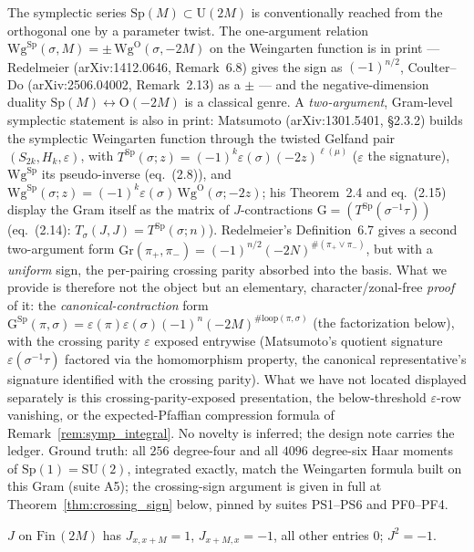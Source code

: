 The symplectic series $\mathrm{Sp}(M)\subset\mathrm U(2M)$ is conventionally
reached from the orthogonal one by a parameter twist. The one-argument
relation $\mathrm{Wg}^{\mathrm{Sp}}(\sigma,M) = \pm\,\mathrm{Wg}^{\mathrm O}(\sigma,-2M)$
on the Weingarten function is in print --- Redelmeier (arXiv:1412.0646,
Remark~6.8) gives the sign as $(-1)^{n/2}$, Coulter--Do (arXiv:2506.04002,
Remark~2.13) as a $\pm$ --- and the negative-dimension duality
$\mathrm{Sp}(M)\leftrightarrow\mathrm O(-2M)$ is a classical genre. A
\emph{two-argument}, Gram-level symplectic statement is also in print:
Matsumoto (arXiv:1301.5401, \S2.3.2) builds the symplectic Weingarten
function through the twisted Gelfand pair $(S_{2k},H_k,\varepsilon)$, with
$T^{\mathrm{Sp}}(\sigma;z)=(-1)^k\varepsilon(\sigma)(-2z)^{\ell(\mu)}$
($\varepsilon$ the signature), $\mathrm{Wg}^{\mathrm{Sp}}$ its pseudo-inverse
(eq.~(2.8)), and $\mathrm{Wg}^{\mathrm{Sp}}(\sigma;z) =
(-1)^k\varepsilon(\sigma)\,\mathrm{Wg}^{\mathrm O}(\sigma;-2z)$; his
Theorem~2.4 and eq.~(2.15) display the Gram itself as the matrix of
$J$-contractions $\mathrm G=(T^{\mathrm{Sp}}(\sigma^{-1}\tau))$ (eq.~(2.14):
$T_\sigma(J,J)=T^{\mathrm{Sp}}(\sigma;n)$). Redelmeier's Definition~6.7 gives
a second two-argument form $\mathrm{Gr}(\pi_+,\pi_-) =
(-1)^{n/2}(-2N)^{\#(\pi_+\vee\pi_-)}$, but with a \emph{uniform} sign, the
per-pairing crossing parity absorbed into the basis. What we provide is
therefore not the object but an elementary, character/zonal-free \emph{proof}
of it: the \emph{canonical-contraction} form $\mathrm G^{\mathrm{Sp}}(\pi,\sigma) =
\varepsilon(\pi)\varepsilon(\sigma)(-1)^n(-2M)^{\#\mathrm{loop}(\pi,\sigma)}$
(the factorization below), with the crossing parity $\varepsilon$ exposed
entrywise (Matsumoto's quotient signature $\varepsilon(\sigma^{-1}\tau)$
factored via the homomorphism property, the canonical representative's
signature identified with the crossing parity). What we have not located
displayed separately is this crossing-parity-exposed presentation, the
below-threshold $\varepsilon$-row vanishing, or the expected-Pfaffian
compression formula of Remark~\ref{rem:symp_integral}. No novelty is
inferred; the design note carries the ledger. Ground truth: all $256$
degree-four and all $4096$ degree-six Haar moments of
$\mathrm{Sp}(1)=\mathrm{SU}(2)$, integrated exactly, match the Weingarten
formula built on this Gram (suite A5); the crossing-sign argument is
given in full at Theorem~\ref{thm:crossing_sign} below, pinned by
suites PS1--PS6 and PF0--PF4.

\begin{definition}\label{def:j_form}
\leanok
$J$ on $\mathrm{Fin}\,(2M)$ has $J_{x,x+M}=1$, $J_{x+M,x}=-1$, all other
entries $0$; $J^2=-1$.
\end{definition}

